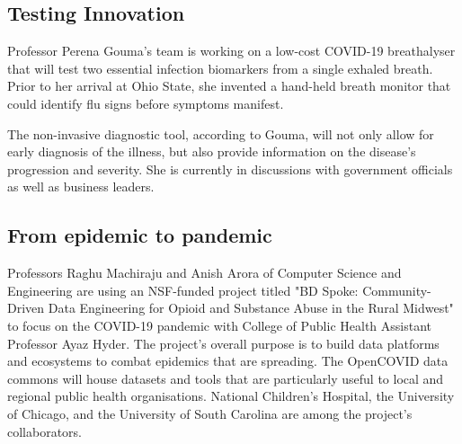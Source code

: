 \documentclass[12pt]{article}
\begin{document}
\subsection{Testing Innovation}
Professor Perena Gouma's team is working on a low-cost COVID-19 breathalyser that will test two essential infection biomarkers from a single exhaled breath. Prior to her arrival at Ohio State, she invented a hand-held breath monitor that could identify flu signs before symptoms manifest.


The non-invasive diagnostic tool, according to Gouma, will not only allow for early diagnosis of the illness, but also provide information on the disease's progression and severity. She is currently in discussions with government officials as well as business leaders.
\subsection{From epidemic to pandemic}
Professors Raghu Machiraju and Anish Arora of Computer Science and Engineering are using an NSF-funded project titled "BD Spoke: Community-Driven Data Engineering for Opioid and Substance Abuse in the Rural Midwest" to focus on the COVID-19 pandemic with College of Public Health Assistant Professor Ayaz Hyder. The project's overall purpose is to build data platforms and ecosystems to combat epidemics that are spreading. The OpenCOVID data commons will house datasets and tools that are particularly useful to local and regional public health organisations. National Children's Hospital, the University of Chicago, and the University of South Carolina are among the project's collaborators.
\end{document}
